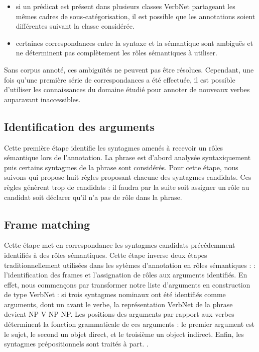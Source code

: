 \begin{itemize}

    \item si un prédicat est présent dans plusieurs classes VerbNet partageant
    les mêmes cadres de sous-catégorisation, il est possible que les annotations
    soient différentes suivant la classe considérée.

    \item certaines correspondances entre la syntaxe et la sémantique sont
    ambiguës et ne déterminent pas complètement les rôles sémantiques à utiliser.

\end{itemize}

Sans corpus annoté, ces ambiguïtés ne peuvent pas être résolues. Cependant, une
fois qu'une première série de correspondances a été effectuée, il est possible
d'utiliser les connaissances du domaine étudié pour annoter de nouveaux verbes
auparavant inaccessibles.

\subsection{Identification des arguments}

Cette première étape identifie les syntagmes amenés à recevoir un rôles
sémantique lors de l'annotation. La phrase est d'abord analysée syntaxiquement
puis certains syntagmes de la phrase sont considérés. Pour cette étape, nous
suivons \cite{lang2011unsupervised} qui propose huit règles proposant chacune
des syntagmes candidats. Ces règles génèrent trop de candidats : il faudra par
la suite soit assigner un rôle au candidat soit déclarer qu'il n'a pas de rôle
dans la phrase.


\subsection{Frame matching}

Cette étape met en correspondance les syntagmes candidats précédemment
identifiés à des rôles sémantiques. Cette étape inverse deux étapes
traditionnellement utilisées dans les sytèmes d'annotation en rôles sémantiques
: \citep{gildea2002automatic,das2014frame} : l'identification des frames et
l'assignation de rôles aux arguments identifiés. En effet, nous commençons par
transformer notre liste d'arguments en construction de type VerbNet : si trois
syntagmes nominaux ont été identifiés comme arguments, dont un avant le verbe,
la représentation VerbNet de la phrase devient NP V NP NP.
Les positions des arguments par rapport aux verbes déterminent la fonction
grammaticale de ces arguments : le premier argument est le sujet, le second un
objet direct, et le troisième un object indirect. Enfin, les syntagmes
prépositionnels sont traités à part. \citep{swier2005exploiting}.


